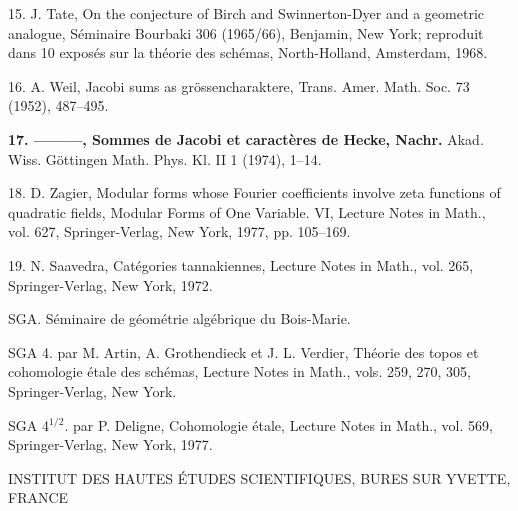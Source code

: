 \documentclass[10pt,twoside]{article}
\newcommand{\SectionLead}[1]{\textbf{\color{D030Accent}#1}}
\begin{document}
15. J. Tate, On the conjecture of Birch and Swinnerton-Dyer and a geometric analogue, Séminaire Bourbaki 306 (1965/66), Benjamin, New York; reproduit dans 10 exposés sur la théorie des schémas, North-Holland, Amsterdam, 1968.\par
16. A. Weil, Jacobi sums as grössencharaktere, Trans. Amer. Math. Soc. 73 (1952), 487–495.\par
\SectionLead{17. ———, Sommes de Jacobi et caractères de Hecke, Nachr.} Akad. Wiss. Göttingen Math. Phys. Kl. II 1 (1974), 1–14.\par
18. D. Zagier, Modular forms whose Fourier coefficients involve zeta functions of quadratic fields, Modular Forms of One Variable. VI, Lecture Notes in Math., vol. 627, Springer-Verlag, New York, 1977, pp. 105–169.\par
19. N. Saavedra, Catégories tannakiennes, Lecture Notes in Math., vol. 265, Springer-Verlag, New York, 1972.\par
SGA. Séminaire de géométrie algébrique du Bois-Marie.\par
SGA 4. par M. Artin, A. Grothendieck et J. L. Verdier, Théorie des topos et cohomologie étale des schémas, Lecture Notes in Math., vols. 259, 270, 305, Springer-Verlag, New York.\par
SGA 4\ensuremath{^{1/2}}. par P. Deligne, Cohomologie étale, Lecture Notes in Math., vol. 569, Springer-Verlag, New York, 1977.\par
\begin{flushright}\small INSTITUT DES HAUTES ÉTUDES SCIENTIFIQUES, BURES SUR YVETTE, FRANCE\end{flushright}
\end{document}
